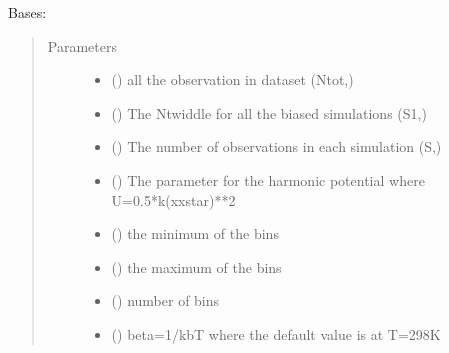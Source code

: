 \documentclass[letterpaper,10pt,english]{sphinxmanual}
\begin{document}
\begin{fulllineitems}
\label{\detokenize{wham:wham.Bwham.Bwham}}
Bases: 
\begin{quote}\begin{description}
\item[{Parameters}] \leavevmode\begin{itemize}
\item {} 
 () \textendash{} all the observation in dataset (Ntot,)

\item {} 
 () \textendash{} The Ntwiddle for all the biased simulations (S\sphinxhyphen{}1,)

\item {} 
 () \textendash{} The number of observations in each simulation (S,)

\item {} 
 () \textendash{} The parameter for the harmonic potential where U=0.5*k(x\sphinxhyphen{}xstar)**2

\item {} 
 () \textendash{} the minimum of the bins

\item {} 
 () \textendash{} the maximum of the bins

\item {} 
 () \textendash{} number of bins

\item {} 
 () \textendash{} beta=1/kbT where the default value is at T=298K


\end{itemize}
\end{description}
\end{quote}
\end{fulllineitems}
\end{document}
